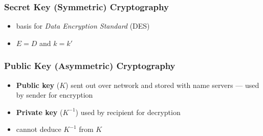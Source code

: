 \documentclass[twocolumn,landscape,10pt]{article}
\theoremstyle{definition}
\begin{document}
\subsubsection{Secret Key (Symmetric) Cryptography}

\begin{itemize}
    \item basis for \emph{Data Encryption Standard} (DES)
    \item $E=D$ and $k=k'$
\end{itemize} 

\subsubsection{Public Key (Asymmetric) Cryptography}

\begin{itemize}
    \item \textbf{Public key} ($K$) sent out over network and stored with name
        servers --- used by sender for encryption
    \item \textbf{Private key} ($K^{-1}$) used by recipient for decryption
    \item cannot deduce $K^{-1}$ from $K$
\end{itemize} 
\end{document}
